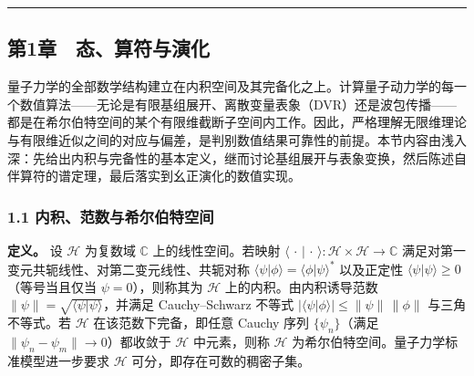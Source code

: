 \documentclass[
]{ctexbook}
\let\origsubsection\subsection
\renewcommand{\subsection}[1]{%
  \needspace{6\baselineskip}%
  \origsubsection{#1}%
}
\begin{document}
\begin{center}\rule{0.5\linewidth}{0.5pt}\end{center}

\hypertarget{ux7b2c1ux7ae0-ux6001ux7b97ux7b26ux4e0eux6f14ux5316}{%
\subsection{第1章　态、算符与演化}\label{ux7b2c1ux7ae0-ux6001ux7b97ux7b26ux4e0eux6f14ux5316}}

量子力学的全部数学结构建立在内积空间及其完备化之上。计算量子动力学的每一个数值算法------无论是有限基组展开、离散变量表象（DVR）还是波包传播------都是在希尔伯特空间的某个有限维截断子空间内工作。因此，严格理解无限维理论与有限维近似之间的对应与偏差，是判别数值结果可靠性的前提。本节内容由浅入深：先给出内积与完备性的基本定义，继而讨论基组展开与表象变换，然后陈述自伴算符的谱定理，最后落实到幺正演化的数值实现。

\hypertarget{ux5185ux79efux8303ux6570ux4e0eux5e0cux5c14ux4f2fux7279ux7a7aux95f4}{%
\subsubsection{1.1
内积、范数与希尔伯特空间}\label{ux5185ux79efux8303ux6570ux4e0eux5e0cux5c14ux4f2fux7279ux7a7aux95f4}}

\textbf{定义。} 设 \(\mathcal{H}\) 为复数域 \(\mathbb{C}\)
上的线性空间。若映射
\(\langle\,\cdot\,|\,\cdot\,\rangle:\mathcal{H}\times\mathcal{H}\to\mathbb{C}\)
满足对第一变元共轭线性、对第二变元线性、共轭对称
\(\langle\psi|\phi\rangle=\langle\phi|\psi\rangle^{*}\) 以及正定性
\(\langle\psi|\psi\rangle\ge 0\)（等号当且仅当 \(\psi=0\)），则称其为
\(\mathcal{H}\) 上的内积。由内积诱导范数
\(\|\psi\|=\sqrt{\langle\psi|\psi\rangle}\)，并满足 Cauchy--Schwarz
不等式 \(|\langle\psi|\phi\rangle|\le\|\psi\|\,\|\phi\|\)
与三角不等式。若 \(\mathcal{H}\) 在该范数下完备，即任意 Cauchy 序列
\(\{\psi_n\}\)（满足 \(\|\psi_n-\psi_m\|\to 0\)）都收敛于
\(\mathcal{H}\) 中元素，则称 \(\mathcal{H}\)
为希尔伯特空间。量子力学标准模型进一步要求 \(\mathcal{H}\)
可分，即存在可数的稠密子集。
\end{document}
